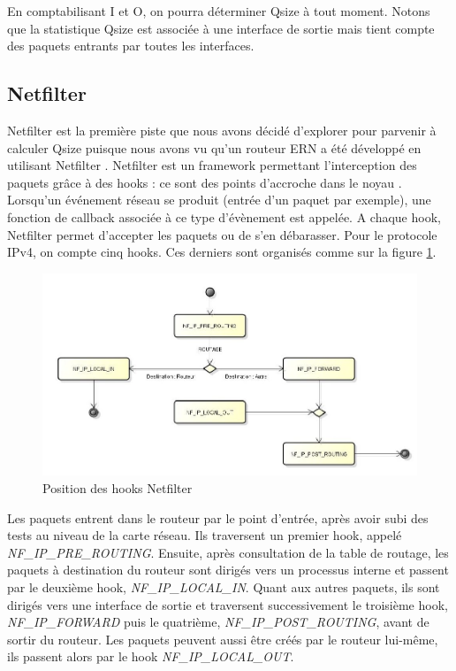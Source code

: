 \documentclass[a4paper]{article}
\begin{document}
En comptabilisant I et O,
on pourra déterminer Qsize à tout moment.
Notons que la statistique Qsize est associée à une interface de sortie mais tient compte des paquets entrants par toutes les interfaces.

\subsection{Netfilter}
Netfilter est la première piste que nous avons décidé d'explorer pour 
parvenir à calculer Qsize puisque nous avons vu qu'un routeur ERN a été développé en utilisant Netfilter \cite{stanford}.
Netfilter est un framework permettant l'interception des paquets
grâce à des hooks : ce sont des points d'accroche dans le noyau \cite{netfilter1}.
Lorsqu'un événement réseau se produit (entrée d'un paquet par exemple),
une fonction de callback associée à ce type d'évènement est appelée.
A chaque hook, Netfilter permet d'accepter les paquets ou de s'en
débarasser. Pour le protocole IPv4, on compte cinq hooks. Ces derniers
sont organisés comme sur la figure \ref{hooks}.

\begin{figure}[!ht]
	\centering
	\includegraphics[scale=.5]{hooks.jpg}
	\caption{\label{hooks} Position des hooks Netfilter}
\end{figure}

Les paquets entrent dans le routeur par le point d'entrée, après avoir 
subi des tests au niveau de la carte réseau. Ils traversent un premier 
hook, appelé \textit{NF\_IP\_PRE\_ROUTING}. Ensuite, après consultation de la table 
de routage, les paquets à destination du routeur sont dirigés vers un 
processus interne et passent par le deuxième hook, \textit{NF\_IP\_LOCAL\_IN}. 
Quant aux autres paquets, ils sont dirigés vers une interface de sortie 
et traversent successivement le troisième hook, \textit{NF\_IP\_FORWARD} puis le 
quatrième, \textit{NF\_IP\_POST\_ROUTING}, avant de sortir du routeur. Les paquets 
peuvent aussi être créés par le routeur lui-même, ils passent alors 
par le hook \textit{NF\_IP\_LOCAL\_OUT}.
\end{document}

